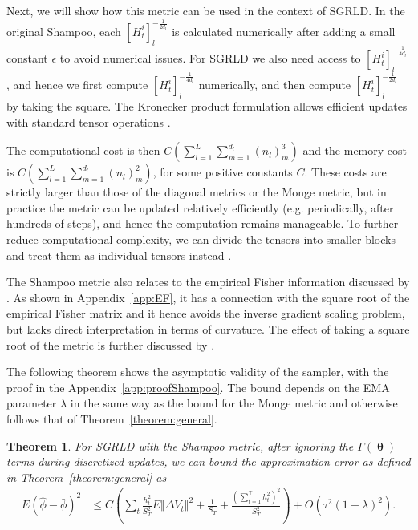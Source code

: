 \documentclass[10pt]{article} %
\DeclareMathOperator{\btheta}{\boldsymbol{\theta}}
\theoremstyle{plain}
\newtheorem{theorem}{Theorem}[section]
\theoremstyle{definition}
\theoremstyle{remark}
\begin{document}
Next, we will show how this metric can be used in the context of SGRLD. In the original Shampoo, each $[H^{i}_{t}]_{l}^{-\frac{1}{2d_l}}$ is calculated numerically after adding a small constant $\epsilon$ to avoid numerical issues. For SGRLD we also need access to $[H^{i}_{t}]_{l}^{-\frac{1}{4d_l}}$, and hence we first compute $[H^{i}_{t}]_{l}^{-\frac{1}{4d_l}}$ numerically, and then compute $[H^{i}_{t}]_{l}^{-\frac{1}{2d_l}}$ by taking the square. The Kronecker product formulation allows efficient updates with standard tensor operations \citep{Anil2021}.

The computational cost is then $C(\sum_{l=1}^{L}\sum_{m=1}^{d_l}(n_{l})_{m}^{3})$ and the memory cost is $C(\sum_{l=1}^{L}\sum_{m=1}^{d_l}(n_{l})_{m}^{2})$, for some positive constants $C$. 
These costs are strictly larger than those of the diagonal metrics or the Monge metric, but in practice the metric can be updated relatively efficiently (e.g. periodically, after hundreds of steps), and hence the computation remains manageable.
To further reduce computational complexity, we can divide the tensors into smaller blocks and treat them as individual tensors instead \citep{Anil2021}.

The Shampoo metric also relates to the empirical Fisher information discussed by \citet{Kunstner2019}. As shown in Appendix~\ref{app:EF}, it has a connection with the square root of the empirical Fisher matrix and it hence avoids the inverse gradient scaling problem, but lacks direct interpretation in terms of curvature. The effect of taking a square root of the metric is further discussed by \citet{Staib2020}.

The following theorem shows the asymptotic validity of the sampler, with the proof in the Appendix~\ref{app:proofShampoo}. The bound depends on the EMA parameter $\lambda$ in the same way as the bound for the Monge metric and otherwise follows that of Theorem~\ref{theorem:general}.
\begin{theorem}
For SGRLD with the Shampoo metric, after ignoring the $\Gamma(\btheta)$ terms during discretized updates, we can bound the approximation error as defined in Theorem~\ref{theorem:general} as
\begin{align*}
E\left(\hat{\phi}-\bar{\phi}\right)^{2} & \leq C\left(\sum_{t}\frac{h_{t}^2}{S_{T}^{2}}E\Vert\Delta V_{t}\Vert^{2}+\frac{1}{S_T}+\frac{(\sum_{t=1}^{\top}h_{t}^2)^{2}}{S_{T}^2}\right) + O(\tau^{2}(1-\lambda)^2).
\end{align*}
\end{theorem}
\end{document}
